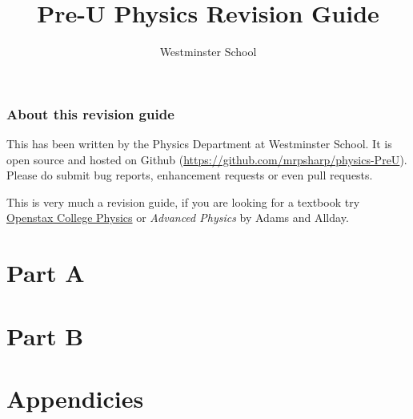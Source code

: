 \documentclass[a4paper,11pt,twoside]{memoir}
\title{Pre-U Physics Revision Guide}
\author{Westminster School}
\newcounter{spec}[chapter]
\begin{document}
\frontmatter
\begin{titlingpage}
	\maketitle
		\thispagestyle{empty}
	\clearpage
	\section*{About this revision guide}
	This has been written by the Physics Department at Westminster School. It is open source and hosted on Github (\url{https://github.com/mrpsharp/physics-PreU}). Please do submit bug reports, enhancement requests or even pull requests.

	This is very much a revision guide, if you are looking for a textbook try \href{https://openstax.org/details/books/college-physics}{Openstax College Physics} or \emph{Advanced Physics} by Adams and Allday.
\end{titlingpage}

\tableofcontents


\mainmatter
\part*{Part A}









\part*{Part B}











\appendix
\part*{Appendicies}



\backmatter
\end{document}
